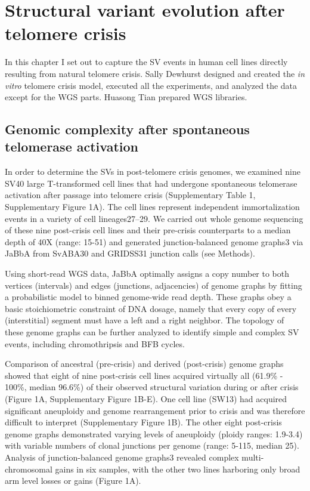 \documentclass[phd,tocprelim]{cornell}
\begin{document}
\chapter{Structural variant evolution after telomere crisis} \label{chap:tel_crisis}
In this chapter I set out to capture the SV events in human cell lines directly resulting from natural telomere crisis. Sally Dewhurst designed and created the \textit{in vitro} telomere crisis model, executed all the experiments, and analyzed the data except for the WGS parts. Huasong Tian prepared WGS libraries.


\section{Genomic complexity after spontaneous telomerase activation}
In order to determine the SVs in post-telomere crisis genomes, we examined nine SV40 large T-transformed cell lines that had undergone spontaneous telomerase activation after passage into telomere crisis (Supplementary Table 1, Supplementary Figure 1A). The cell lines represent independent immortalization events in a variety of cell lineages27–29. We carried out whole genome sequencing of these nine post-crisis cell lines and their pre-crisis counterparts to a median depth of 40X (range: 15-51) and generated junction-balanced genome graphs3 via JaBbA from SvABA30 and GRIDSS31 junction calls (see Methods).  

Using short-read WGS data, JaBbA optimally assigns a copy number to both vertices (intervals) and edges (junctions, adjacencies) of genome graphs by fitting a probabilistic model to binned genome-wide read depth. These graphs obey a basic stoichiometric constraint of DNA dosage, namely that every copy of every (interstitial) segment must have a left and a right neighbor. The topology of these genome graphs can be further analyzed to identify simple and complex SV events, including chromothripsis and BFB cycles. 

Comparison of ancestral (pre-crisis) and derived (post-crisis) genome graphs showed that eight of nine post-crisis cell lines acquired virtually all (61.9\% - 100\%, median 96.6\%) of their observed structural variation during or after crisis (Figure 1A, Supplementary Figure 1B-E). One cell line (SW13) had acquired significant aneuploidy and genome rearrangement prior to crisis and was therefore difficult to interpret (Supplementary Figure 1B). The other eight post-crisis genome graphs demonstrated varying levels of aneuploidy (ploidy ranges: 1.9-3.4) with variable numbers of clonal junctions per genome (range: 5-115, median 25). Analysis of junction-balanced genome graphs3 revealed complex multi-chromosomal gains in six samples, with the other two lines harboring only broad arm level losses or gains (Figure 1A).
\end{document}
